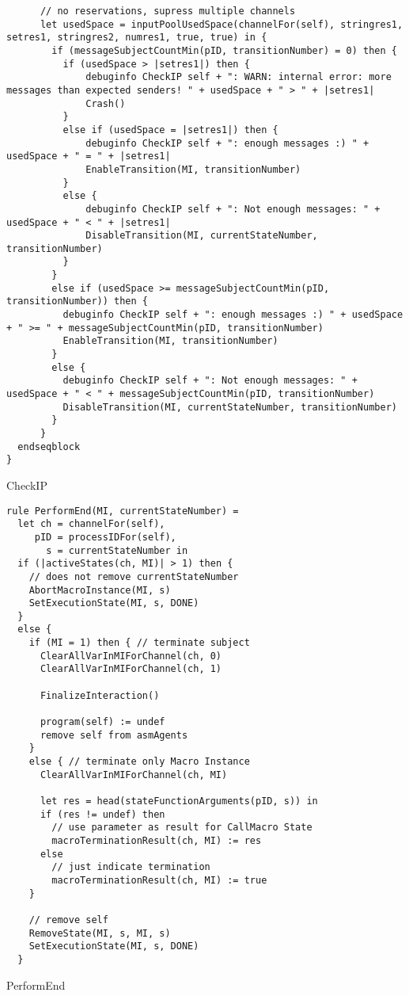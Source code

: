 \begin{listing}[H]
\begin{verbatim}
      // no reservations, supress multiple channels
      let usedSpace = inputPoolUsedSpace(channelFor(self), stringres1, setres1, stringres2, numres1, true, true) in {
        if (messageSubjectCountMin(pID, transitionNumber) = 0) then {
          if (usedSpace > |setres1|) then {
              debuginfo CheckIP self + ": WARN: internal error: more messages than expected senders! " + usedSpace + " > " + |setres1|
              Crash()
          }
          else if (usedSpace = |setres1|) then {
              debuginfo CheckIP self + ": enough messages :) " + usedSpace + " = " + |setres1|
              EnableTransition(MI, transitionNumber)
          }
          else {
              debuginfo CheckIP self + ": Not enough messages: " + usedSpace + " < " + |setres1|
              DisableTransition(MI, currentStateNumber, transitionNumber)
          }
        }
        else if (usedSpace >= messageSubjectCountMin(pID, transitionNumber)) then {
          debuginfo CheckIP self + ": enough messages :) " + usedSpace + " >= " + messageSubjectCountMin(pID, transitionNumber)
          EnableTransition(MI, transitionNumber)
        }
        else {
          debuginfo CheckIP self + ": Not enough messages: " + usedSpace + " < " + messageSubjectCountMin(pID, transitionNumber)
          DisableTransition(MI, currentStateNumber, transitionNumber)
        }
      }
  endseqblock
}
\end{verbatim}
\caption{CheckIP}
\label{lst:asm:CheckIP}
\end{listing}






\begin{listing}[H]
\begin{verbatim}
rule PerformEnd(MI, currentStateNumber) =
  let ch = channelFor(self),
     pID = processIDFor(self),
       s = currentStateNumber in
  if (|activeStates(ch, MI)| > 1) then {
    // does not remove currentStateNumber
    AbortMacroInstance(MI, s)
    SetExecutionState(MI, s, DONE)
  }
  else {
    if (MI = 1) then { // terminate subject
      ClearAllVarInMIForChannel(ch, 0)
      ClearAllVarInMIForChannel(ch, 1)

      FinalizeInteraction()

      program(self) := undef
      remove self from asmAgents
    }
    else { // terminate only Macro Instance
      ClearAllVarInMIForChannel(ch, MI)

      let res = head(stateFunctionArguments(pID, s)) in
      if (res != undef) then
        // use parameter as result for CallMacro State
        macroTerminationResult(ch, MI) := res
      else
        // just indicate termination
        macroTerminationResult(ch, MI) := true
    }

    // remove self
    RemoveState(MI, s, MI, s)
    SetExecutionState(MI, s, DONE)
  }
\end{verbatim}
\caption{PerformEnd}
\label{lst:asm:PerformEnd}
\end{listing}






